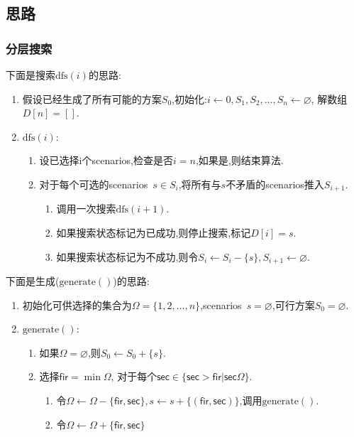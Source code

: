\documentclass[UTF8]{ctexart}
\begin{document}
\subsection{思路}
\subsubsection{分层搜索}
\indent 下面是搜索$\mathrm{dfs}(i)$的思路:
\begin{enumerate}[]
    \item 假设已经生成了所有可能的方案$S_0$,初始化:$i \leftarrow 0, S_1,S_2,\dots , S_{n}\leftarrow \varnothing$, 解数组$D[n] = []$.
    \item $\mathrm{dfs}(i)$:
    \begin{enumerate}[1]
        \item 设已选择i个scenarios,检查是否$i = n$,如果是,则结束算法.
        \item 对于每个可选的scenarios\ $s \in S_i$,将所有与$s$不矛盾的scenarios推入$S_{i+1}$.
        \begin{enumerate}[1]
            \item 调用一次搜索$\mathrm{dfs}(i+1)$.
        \item 如果搜索状态标记为已成功,则停止搜索,标记$D[i] = s$.
        \item 如果搜索状态标记为不成功,则令$S_i \leftarrow S_i - \{s\}, S_{i+1}\leftarrow \varnothing$.
        \end{enumerate}
    \end{enumerate}
\end{enumerate}


下面是生成($\mathrm{generate}()$)的思路:
\begin{enumerate}[]
    \item 初始化可供选择的集合为$\Omega = \{1, 2, \dots, n\}$,scenarios\ $s=\varnothing$,可行方案$S_0=\varnothing$.
    \item $\mathrm{generate}()$:
    \begin{enumerate}[1]
    \item 如果$\Omega = \varnothing$,则$S_0 \leftarrow S_0 + \{s\}$.
    \item 选择$\mathsf{fir} = \min \Omega$, 对于每个$\mathsf{sec} \in \{\mathsf{sec}>\mathsf{fir}| \mathsf{sec} \Omega\}$.
    \begin{enumerate}[1]
        \item 令$\Omega \leftarrow \Omega - \{\mathsf{fir}, \mathsf{sec}\}, s \leftarrow s + \{(\mathsf{fir},\mathsf{sec})\}$,调用$\mathrm{generate}()$.
        \item 令$\Omega \leftarrow \Omega + \{\mathsf{fir}, \mathsf{sec}\}$
    \end{enumerate}
\end{enumerate}
\end{enumerate}
\end{document}
